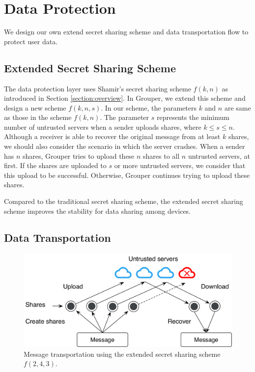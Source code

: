 \documentclass[a4paper,11pt]{report}
\begin{document}
\section{Data Protection}  \label{section:data_protection}

We design our own extend secret sharing scheme and data transportation flow to protect user data.

\subsection{Extended Secret Sharing Scheme}

The data protection layer uses Shamir's secret sharing scheme $f(k, n)$ as introduced in Section \ref{section:overview}.
In Grouper, we extend this scheme and design a new scheme $ f(k, n, s)$.
In our scheme, the parameters $k$ and $n$ are same as those in the scheme $f(k, n)$. 
The parameter $s$ represents the minimum number of untrusted servers when a sender uploads shares, where $k \leq s \leq n$.
Although a receiver is able to recover the original message from at least $k$ shares, we should also consider the scenario in which the server crashes. 
When a sender has $n$ shares, Grouper tries to upload these $n$ shares to all $n$ untrusted servers, at first. 
If the shares are uploaded to $s$ or more untrusted servers, we consider that this upload to be successful.
Otherwise, Grouper continues trying to upload these shares.

Compared to the traditional secret sharing scheme, the extended secret sharing scheme improves the stability for data sharing among devices.

\subsection{Data Transportation}

\begin{figure}[t]
	\centering
	\includegraphics[scale=0.65]{transportation}
	\caption{Message transportation using the extended secret sharing scheme $f(2, 4, 3)$.}
	\label{fig:transportation}
\end{figure}
\end{document}
